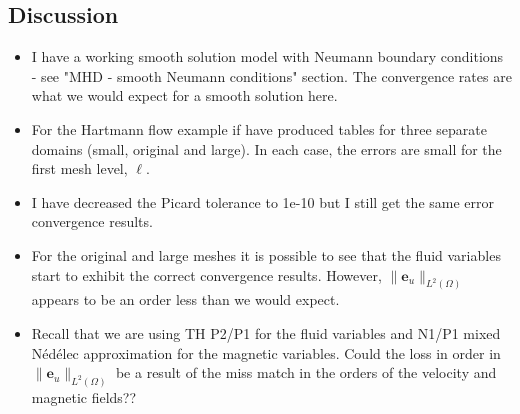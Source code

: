 \documentclass{article}
\newcommand{\nedelec}{N\'{e}d\'{e}lec }
\newcommand{\uu}[1]{\boldsymbol #1}
\begin{document}
\subsection*{Discussion}

\begin{itemize}
  \item I have a working smooth solution model with Neumann boundary conditions - see "MHD - smooth Neumann conditions" section. The convergence rates are what we would expect for a smooth solution here.
  \item For the Hartmann flow example if have produced tables for three separate domains (small, original and large). In each case, the errors are small for the first mesh level, $\ell$.
  \item I have decreased the Picard tolerance to 1e-10 but I still get the same error convergence results.
  \item For the original and large meshes it is possible to see that the fluid variables start to exhibit the correct convergence results. However, $\|\uu{e}_u\|_{L^2(\Omega)}$ appears to be an order less than we would expect.
  \item Recall that we are using TH P2/P1 for the fluid variables and N1/P1 mixed \nedelec approximation for the magnetic variables. Could the loss in order in $\|\uu{e}_u\|_{L^2(\Omega)}$ be a result of the miss match in the orders of the velocity and magnetic fields??

\end{itemize}
\end{document}
